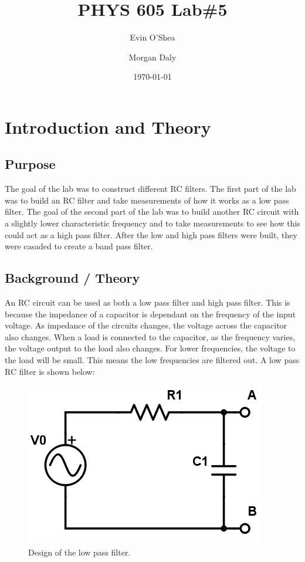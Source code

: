 \documentclass[twocolumn, amsmath]{revtex4}
\begin{document}
\title{PHYS 605 Lab\#5} 
\author{Evin O'Shea}  %
\author{Morgan Daly}
\date{\today}  


\begin{abstract}
\end{abstract}

\maketitle



\section{Introduction and Theory}

\subsection{Purpose}
The goal of the lab was to construct different RC filters. The first part of the lab was to build an RC filter and take measurements of how it works as a low pass filter. The goal of the second part of the lab was to build another RC circuit with a slightly lower characteristic frequency and to take measurements to see how this could act as a high pass filter. After the low and high pass filters were built, they were casaded to create a band pass filter.


\subsection{Background / Theory} 
An RC circuit can be used as both a low pass filter and high pass filter. This is because the impedance of a capacitor is dependant on the frequency of the input voltage. As impedance of the circuits changes, the voltage across the capacitor also changes. When a load is connected to the capacitor, as the frequency varies, the voltage output to the load also changes. For lower frequencies, the voltage to the load will be small. This means the low frequencies are filtered out. A low pass RC filter is shown below:

\begin{figure}[h]  
	\includegraphics[scale = 0.2]{lowpassfilter.png}
	\caption{Design of the low pass filter.}
\end{figure}
\end{document}
